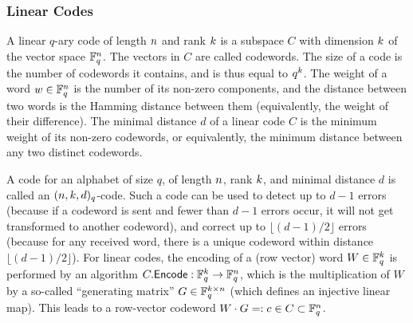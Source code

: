 

\subsubsection{Linear Codes}
A linear $q$-ary code of length $n$ and rank $k$ is a subspace $C$ with dimension $k$ of the vector space $\mathbb{F}_q^{n}$.
The vectors in $C$ are called codewords. The size of a code is the number of codewords it contains, and is thus equal to $q^{k}$.
The weight of a word $w\in\mathbb{F}_q^{n}$ is the number of its non-zero components, and the distance between two words is the Hamming distance between them (equivalently, the weight of their difference).
The minimal distance $d$ of a linear code $C$ is the minimum weight of its non-zero codewords, or equivalently, the minimum distance between any two distinct codewords.

A code for an alphabet of size $q$, of length $n$, rank $k$, and minimal distance $d$ is called an $(n,k,d)_q$-code. Such a code can be used to detect up to $d-1$ errors (because if a codeword is sent and fewer than $d-1$ errors occur, it will not get transformed to another codeword), and correct up to $\lfloor(d-1)/2\rfloor$ errors (because for any received word, there is a unique codeword within distance $\lfloor(d-1)/2\rfloor$).
For linear codes, the encoding of a (row vector) word $W\in\mathbb{F}_q^{k}$ is performed by an algorithm $C.\mathsf{Encode}:\mathbb{F}_q^{k}\rightarrow \mathbb{F}_q^{n}$, which is the multiplication of $W$ by a so-called ``generating matrix'' $G\in\mathbb{F}_q^{k\times n}$ (which defines an injective linear map).
This leads to a row-vector codeword $W\cdot G=:c\in C\subset\mathbb{F}_q^{n}$. 


